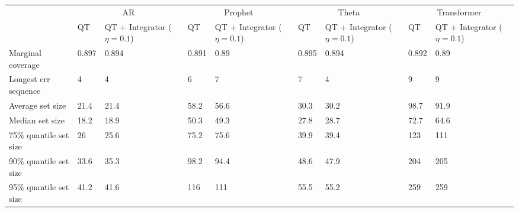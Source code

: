 \begin{tabular}{lllllllll}
\toprule
& \multicolumn{2}{c}{AR}& \multicolumn{2}{c}{Prophet}& \multicolumn{2}{c}{Theta}& \multicolumn{2}{c}{Transformer} \\
& QT & QT + Integrator ($\eta=0.1$) & QT & QT + Integrator ($\eta=0.1$) & QT & QT + Integrator ($\eta=0.1$) & QT & QT + Integrator ($\eta=0.1$) \\
\midrule
Marginal coverage & 0.897 & 0.894 & 0.891 & 0.89 & 0.895 & 0.894 & 0.892 & 0.89 \\
Longest err sequence & 4 & 4 & 6 & 7 & 7 & 4 & 9 & 9 \\
Average set size & 21.4 & 21.4 & 58.2 & 56.6 & 30.3 & 30.2 & 98.7 & 91.9 \\
Median set size & 18.2 & 18.9 & 50.3 & 49.3 & 27.8 & 28.7 & 72.7 & 64.6 \\
75\% quantile set size & 26 & 25.6 & 75.2 & 75.6 & 39.9 & 39.4 & 123 & 111 \\
90\% quantile set size & 33.6 & 35.3 & 98.2 & 94.4 & 48.6 & 47.9 & 204 & 205 \\
95\% quantile set size & 41.2 & 41.6 & 116 & 111 & 55.5 & 55.2 & 259 & 259 \\
\bottomrule
\end{tabular}
